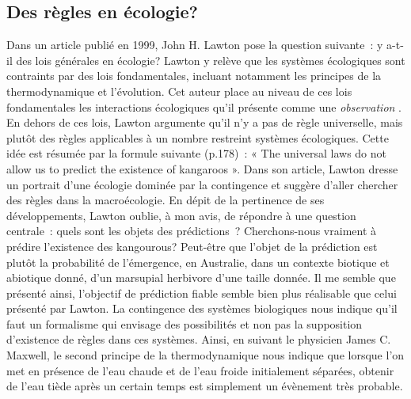 \subsection*{Des règles en
écologie?}\label{des-ruxe8gles-en-uxe9cologie}

Dans un article publié en 1999, John H. Lawton pose la question
suivante~: y a-t-il des lois générales en écologie? Lawton y relève que
les systèmes écologiques sont contraints par des lois fondamentales,
incluant notamment les principes de la thermodynamique et l'évolution.
Cet auteur place au niveau de ces lois fondamentales les interactions
écologiques qu'il présente comme une \emph{observation} \citep[selon ces
mots,][]{Lawton1999}. En dehors de ces lois, Lawton argumente qu'il n'y
a pas de règle universelle, mais plutôt des règles applicables à un
nombre restreint systèmes écologiques. Cette idée est résumée par la
formule suivante (p.178)~: « The universal laws do not allow us to
predict the existence of kangaroos ». Dans son article, Lawton dresse un
portrait d'une écologie dominée par la contingence et suggère d'aller
chercher des règles dans la macroécologie. En dépit de la pertinence de
ses développements, Lawton oublie, à mon avis, de répondre à une
question centrale~: quels sont les objets des prédictions~?
Cherchons-nous vraiment à prédire l'existence des kangourous? Peut-être
que l'objet de la prédiction est plutôt la probabilité de l'émergence,
en Australie, dans un contexte biotique et abiotique donné, d'un
marsupial herbivore d'une taille donnée. Il me semble que présenté
ainsi, l'objectif de prédiction fiable semble bien plus réalisable que
celui présenté par Lawton. La contingence des systèmes biologiques nous
indique qu'il faut un formalisme qui envisage des possibilités et non
pas la supposition d'existence de règles dans ces systèmes. Ainsi, en
suivant le physicien James C. Maxwell, le second principe de la
thermodynamique nous indique que lorsque l'on met en présence de l'eau
chaude et de l'eau froide initialement séparées, obtenir de l'eau tiède
après un certain temps est simplement un évènement très probable.

